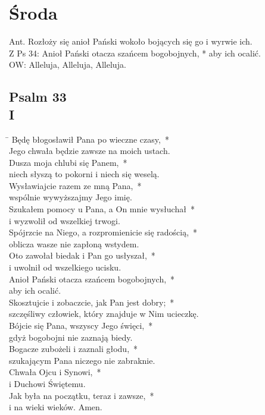 \section*{Środa}
Ant. Rozłoży się anioł Pański wokoło bojących się go i wyrwie ich.\\
Z Ps 34: Anioł Pański otacza szańcem bogobojnych, * aby ich ocalić.\\
OW: Alleluja, Alleluja, Alleluja.
\subsection*{Psalm 33\\I}
\begin{tabbing}
\hspace{4mm} \= \>\kill
Będę błogosławił Pana po wieczne czasy,~*\\
Jego chwała będzie zawsze na moich ustach.\\
\>Dusza moja chlubi się Panem,~*\\
\>niech słyszą to pokorni i niech się weselą.\\
Wysławiajcie razem ze mną Pana,~*\\
wspólnie wywyższajmy Jego imię.\\
\>Szukałem pomocy u Pana, a On mnie wysłuchał~*\\
\>i wyzwolił od wszelkiej trwogi.\\
Spójrzcie na Niego, a rozpromienicie się radością,~*\\
oblicza wasze nie zapłoną wstydem.\\
\>Oto zawołał biedak i Pan go usłyszał,~*\\
\>i uwolnił od wszelkiego ucisku.\\
Anioł Pański otacza szańcem bogobojnych,~*\\
aby ich ocalić.\\
\>Skosztujcie i zobaczcie, jak Pan jest dobry;~*\\
\>szczęśliwy człowiek, który znajduje w Nim ucieczkę.\\
Bójcie się Pana, wszyscy Jego święci,~*\\
gdyż bogobojni nie zaznają biedy.\\
\>Bogacze zubożeli i zaznali głodu,~*\\
\>szukającym Pana niczego nie zabraknie.\\
Chwała Ojcu i Synowi,~*\\
i Duchowi Świętemu.\\
\>Jak była na początku, teraz i zawsze,~*\\
\>i na wieki wieków. Amen.
\end{tabbing}

